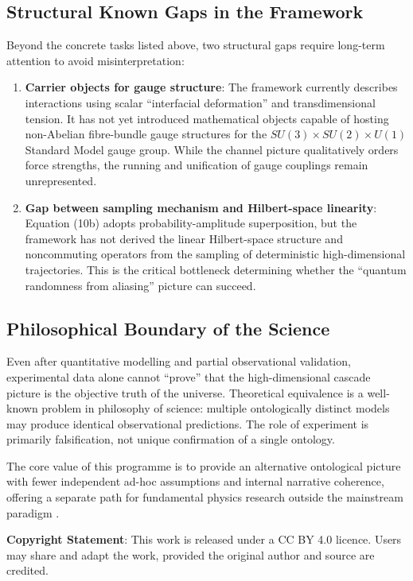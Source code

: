 \documentclass[12pt,a4paper]{article}
\begin{document}
\subsection{Structural Known Gaps in the Framework}
Beyond the concrete tasks listed above, two structural gaps require long-term attention to avoid misinterpretation:
\begin{enumerate}
\item \textbf{Carrier objects for gauge structure}: The framework currently describes interactions using scalar “interfacial deformation” and transdimensional tension. It has not yet introduced mathematical objects capable of hosting non-Abelian fibre-bundle gauge structures for the $SU(3)\times SU(2)\times U(1)$ Standard Model gauge group. While the channel picture qualitatively orders force strengths, the running and unification of gauge couplings remain unrepresented.
\item \textbf{Gap between sampling mechanism and Hilbert-space linearity}: Equation (10b) adopts probability-amplitude superposition, but the framework has not derived the linear Hilbert-space structure and noncommuting operators from the sampling of deterministic high-dimensional trajectories. This is the critical bottleneck determining whether the “quantum randomness from aliasing” picture can succeed.
\end{enumerate}

\subsection{Philosophical Boundary of the Science}
Even after quantitative modelling and partial observational validation, experimental data alone cannot “prove” that the high-dimensional cascade picture is the objective truth of the universe. Theoretical equivalence is a well-known problem in philosophy of science: multiple ontologically distinct models may produce identical observational predictions. The role of experiment is primarily falsification, not unique confirmation of a single ontology.

The core value of this programme is to provide an alternative ontological picture with fewer independent ad-hoc assumptions and internal narrative coherence, offering a separate path for fundamental physics research outside the mainstream paradigm \cite{popper1959, kuhn1962}.

\vspace{1em}
\noindent \textbf{Copyright Statement}: This work is released under a CC BY 4.0 licence. Users may share and adapt the work, provided the original author and source are credited.
\end{document}

